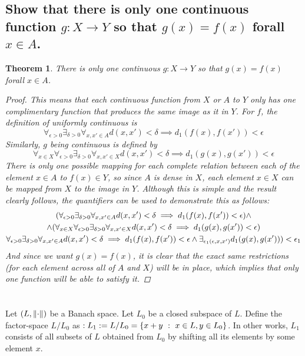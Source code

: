 \documentclass[]{article}
\newcommand{\st}{\ : \ }
\newtheorem{theorem}{Theorem}
\begin{document}
\subsection{Show that there is only one continuous function $g : X \to Y$ so that $g(x) = f(x)$ forall $x \in A$.}
\begin{theorem}
    There is only one continuous $g : X \to Y$ so that $g(x) = f(x)$ forall $x \in A$.
    \begin{proof}
        This means that each continuous function from $X$ or $A$ to $Y$ only has one complimentary function that produces the same image as it in $Y$.
        For $f$, the definition of uniformly continuous is
        \[\forall_{\epsilon>0} \exists_{\delta>0} \forall_{x,x' \in A} d(x,x') < \delta \implies d_1(f(x), f(x')) < \epsilon\]
        Similarly, $g$ being continuous is defined by 
        \[\forall_{x \in X} \forall_{\epsilon>0} \exists_{\delta > 0} \forall_{x, x'\in X} d(x,x') < \delta \implies d_1(g(x),g(x')) < \epsilon\]
        There is only one possible mapping for each complete relation between each of the element $x \in A$ to $f(x) \in Y$, so since $A$ is dense in $X$, each element $x \in X$ can be mapped from $X$ to the image in $Y$.
        Although this is simple and the result clearly follows, the quantifiers can be used to demonstrate this as follows:
        \begin{multline*}
            \qty(\forall_{\epsilon>0} \exists_{\delta>0} \forall_{x,x' \in A} d(x,x') < \delta \implies d_1(f(x), f(x')) < \epsilon) \land \\
            \land \qty(\forall_{x \in X} \forall_{\epsilon>0} \exists_{\delta > 0} \forall_{x, x'\in X} d(x,x') < 
            \delta \implies d_1(g(x),g(x')) < \epsilon)\\
            \forall_{\epsilon>0} \exists_{\delta>0} \forall_{x,x' \in A} d(x,x') < \delta \implies d_1(f(x), f(x')) < \epsilon \land \exists_{\epsilon_1(\epsilon,x,x')} d_1(g(x),g(x'))) < \epsilon_1
        \end{multline*}
        And since we want $g(x) = f(x)$, it is clear that the exact same restrictions (for each element across all of $A$ and $X$) will be in place, which implies that only one function will be able to satisfy it.
    \end{proof}
\end{theorem}

\newpage
\section{}
Let $(L, \norm{\cdot})$ be a Banach space. 
Let $L_0$ be a closed subspace of $L$. 
Define the factor-space $L/L_0$ as $:L_1 := L/L_0 = \qty{x + y \st x \in L, y \in L_0}$. 
In other works, $L_1$ consists of all subsets of $L$ obtained from $L_0$ by shifting all its elements by some element $x$. 
\end{document}
